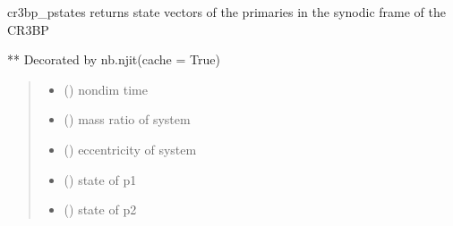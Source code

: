 \documentclass[letterpaper,10pt,english]{sphinxmanual}
\begin{document}
\begin{fulllineitems}
\label{\detokenize{models:pyraa.models.cr3bp_pstates}}
\pysigstartsignatures
{}
\pysigstopsignatures
\sphinxAtStartPar
cr3bp\_pstates \sphinxhyphen{} returns state vectors of the primaries in the synodic
frame of the CR3BP

\sphinxAtStartPar
** Decorated by nb.njit(cache = True)
\begin{quote}\begin{description}
\begin{itemize}
\item {} 
\sphinxAtStartPar
{} () \sphinxhyphen{}\sphinxhyphen{} non\sphinxhyphen{}dim time

\item {} 
\sphinxAtStartPar
{} () \sphinxhyphen{}\sphinxhyphen{} mass ratio of system

\item {} 
\sphinxAtStartPar
{} () \sphinxhyphen{}\sphinxhyphen{} eccentricity of system

\end{itemize}

\sphinxAtStartPar
\begin{itemize}
\item {} 
\sphinxAtStartPar
{} () \sphinxhyphen{}\sphinxhyphen{} state of p1

\item {} 
\sphinxAtStartPar
{} () \sphinxhyphen{}\sphinxhyphen{} state of p2

\end{itemize}


\end{description}\end{quote}

\end{fulllineitems}
\end{document}
